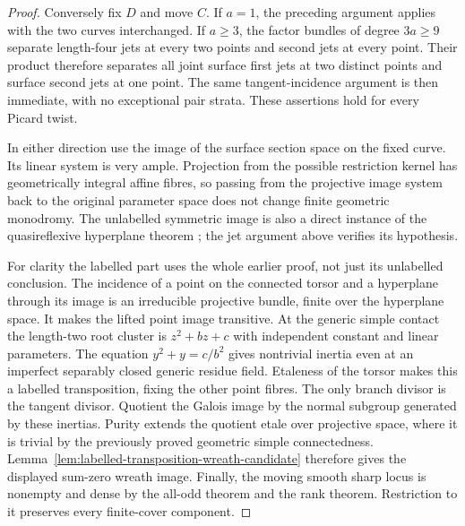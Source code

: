 \begin{proof}
Conversely fix $D$ and move $C$. If $a=1$, the preceding
argument applies with the two curves interchanged. If
$a\geq3$, the factor bundles of degree $3a\geq9$ separate
length-four jets at every two points and second jets at
every point. Their product therefore separates all joint
surface first jets at two distinct points and surface
second jets at one point. The same tangent-incidence
argument is then immediate, with no exceptional pair
strata. These assertions hold for every Picard twist.

In either direction use the image of the surface section
space on the fixed curve. Its linear system is very ample.
Projection from the possible restriction kernel has
geometrically integral affine fibres, so passing from the
projective image system back to the original parameter
space does not change finite geometric monodromy.
The unlabelled symmetric image is also a direct instance
of the quasireflexive hyperplane theorem
\cite[Theorem~2 and Proposition~3.1]{Entin2021}; the jet
argument above verifies its hypothesis.

For clarity the labelled part uses the whole earlier
proof, not just its unlabelled conclusion. The incidence
of a point on the connected torsor and a hyperplane through
its image is an irreducible projective bundle, finite over
the hyperplane space. It makes the lifted point image
transitive. At the generic simple contact the length-two
root cluster is $z^2+bz+c$ with independent constant and
linear parameters. The equation $y^2+y=c/b^2$ gives
nontrivial inertia even at an imperfect separably closed
generic residue field. Etaleness of the torsor makes this
a labelled transposition, fixing the other point fibres.
The only branch divisor is the tangent divisor. Quotient
the Galois image by the normal subgroup generated by these
inertias. Purity \cite{Stacks0BMB} extends the quotient
etale over projective space, where it is trivial by the
previously proved geometric simple connectedness.
Lemma~\ref{lem:labelled-transposition-wreath-candidate}
therefore gives the displayed sum-zero wreath image.
Finally, the moving smooth sharp locus is nonempty and
dense by the all-odd theorem and the rank theorem.
Restriction to it preserves every finite-cover component.
\end{proof}

